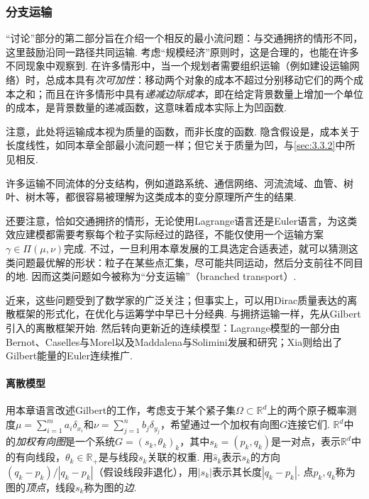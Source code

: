 \subsubsection{分支运输}\label{sec:4.4.2}

\label{idx:root4-p162-subadditivity}“讨论”部分的第二部分旨在介绍一个相反的最小流问题：与交通拥挤的情形不同，这里鼓励沿同一路径共同运输. 考虑“规模经济”原则时，这是合理的，也能在许多不同现象中观察到. 在许多情形中，当一个规划者需要组织运输（例如建设运输网络）时，总成本具有\emph{次可加性}：移动两个对象的成本不超过分别移动它们的两个成本之和；而且在许多情形中具有\emph{递减边际成本}，即在给定背景数量上增加一个单位的成本，是背景数量的递减函数，这意味着成本实际上为凹函数.

注意，此处将运输成本视为质量的函数，而非长度的函数. 隐含假设是，成本关于长度线性，如同本章全部最小流问题一样；但它关于质量为凹，与\autoref{sec:3.3.2}中所见相反.

许多运输不同流体的分支结构，例如道路系统、通信网络、河流流域、血管、树叶、树木等，都很容易被理解为这类成本的变分原理所产生的结果.

还要注意，恰如交通拥挤的情形，无论使用Lagrange语言还是Euler语言，为这类效应建模都需要考察每个粒子实际经过的路径，不能仅使用一个运输方案$\gamma\in\Pi(\mu,\nu)$完成. 不过，一旦利用本章发展的工具选定合适表述，就可以猜测这类问题最优解的形状：粒子在某些点汇集，尽可能共同运动，然后分支前往不同目的地. 因而这类问题如今被称为“分支运输”（branched transport）.

近来，这些问题受到了数学家的广泛关注；但事实上，可以用Dirac质量表达的离散框架的形式化，在优化与运筹学中早已十分经典. 与拥挤运输一样，先从Gilbert引入的离散框架\cite{b185}开始. 然后转向更新近的连续模型：Lagrange模型的一部分由Bernot、Caselles与Morel\cite{b46,b48,b49,b50}以及Maddalena与Solimini\cite{b220,b221}发展和研究；Xia\cite{b297}则给出了Gilbert能量的Euler连续推广.

\paragraph{离散模型}
用本章语言改述Gilbert的工作\cite{b185}，考虑支于某个紧子集$\Omega\subset\mathbb R^d$上的两个原子概率测度$\mu=\sum_{i=1}^m a_i\delta_{x_i}$和$\nu=\sum_{j=1}^n b_j\delta_{y_j}$，希望通过一个加权有向图$G$连接它们. $\mathbb R^d$中的\emph{加权有向图}是一个系统$G=(s_k,\theta_k)_k$，其中$s_k=(p_k,q_k)$是一对点，表示$\mathbb R^d$中的有向线段，$\theta_k\in\mathbb R_+$是与线段$s_k$关联的权重. 用$\hat s_k$表示$s_k$的方向$(q_k-p_k)/|q_k-p_k|$（假设线段非退化），用$|s_k|$表示其长度$|q_k-p_k|$. 点$p_k,q_k$称为图的\emph{顶点}，线段$s_k$称为图的\emph{边}.

